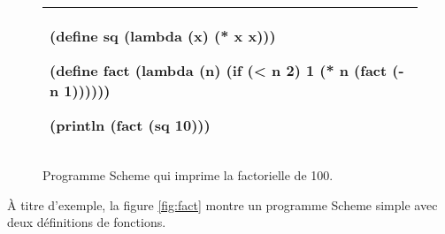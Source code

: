 \begin{figure}[htbp]
  \begin{tabular}{|l|}\hline
\begin{mplisting}{0.7}
(define sq (lambda (x) (* x x)))

(define fact
  (lambda (n)
    (if (< n 2)
        1
        (* n (fact (- n 1))))))

(println (fact (sq 10)))
\end{mplisting}\\\hline
\end{tabular}

\caption{Programme Scheme qui imprime la factorielle de 100.}

\label{fig:fact100}
\end{figure}

À titre d'exemple, la figure \ref{fig:fact} montre un programme Scheme
simple avec deux définitions de fonctions.







